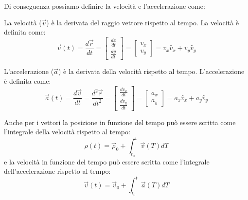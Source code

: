         Di conseguenza possiamo definire la velocità e l'accelerazione come:
        \begin{definition}[Velocità]
            La velocità ($\vec{v}$) è la derivata del raggio vettore rispetto al tempo. La velocità è definita come:
            $$
                \vec{v}(t) = \frac{d\vec{r}}{dt} = \begin{bmatrix} \frac{dx}{dt}\\ \frac{dy}{dt} \end{bmatrix} = \begin{bmatrix} v_x\\ v_y \end{bmatrix} = v_x\hat{v}_x+v_y\hat{v}_y
            $$
        \end{definition}
        \begin{definition}[Accelerazione]
            L'accelerazione ($\vec{a}$) è la derivata della velocità rispetto al tempo. L'accelerazione è definita come:
            $$
                \vec{a}(t) = \frac{d\vec{v}}{dt} = \frac{d^2\vec{r}}{dt^2} = \begin{bmatrix} \frac{dv_x}{dt}\\ \frac{dv_y}{dt} \end{bmatrix} = \begin{bmatrix} a_x\\ a_y \end{bmatrix} = a_x\hat{v}_x+a_y\hat{v}_y
            $$
        \end{definition}
        Anche per i vettori la posizione in funzione del tempo può essere scritta come l'integrale della velocità rispetto al tempo:
        $$
            \rho(t) = \vec{\rho}_0 + \int_{t_0}^{t} \vec{v}(T)dT
        $$
        e la velocità in funzione del tempo può essere scritta come l'integrale dell'accelerazione rispetto al tempo:
        $$
            \vec{v}(t) = \vec{v}_0 + \int_{t_0}^{t} \vec{a}(T)dT
        $$
